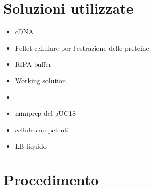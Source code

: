 \documentclass{article}
\begin{document}
\section{Soluzioni utilizzate}
\begin{itemize}
\item cDNA
\item Pellet cellulare per l'estrazione delle proteine
\item RIPA buffer
\item Working solution
\item
\end{itemize}



\begin{itemize}

\item miniprep del pUC18
\item cellule competenti
\item LB liquido

\end{itemize}



\section{Procedimento}
\end{document}
